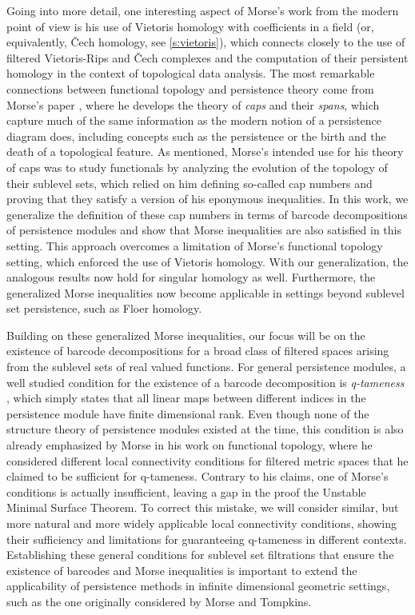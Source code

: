 Going into more detail, one interesting aspect of Morse's work from the modern point of view is his use of Vietoris homology with coefficients in a field (or, equivalently, \v{C}ech homology, see \cref{s:vietoris}), which connects closely to the use of filtered Vietoris-Rips and \v{C}ech complexes and the computation of their persistent homology in the context of topological data analysis.
The most remarkable connections between functional topology and persistence theory come from Morse's paper \cite{Morse.1940}, where he develops the theory of \emph{caps} and their \emph{spans}, which capture much of the same information as the modern notion of a persistence diagram does, including concepts such as the persistence or the birth and the death of a topological feature.
As mentioned, Morse's intended use for his theory of caps was to study functionals by analyzing the evolution of the topology of their sublevel sets, which relied on him defining so-called cap numbers and proving that they satisfy a version of his eponymous inequalities.
In this work, we generalize the definition of these cap numbers in terms of barcode decompositions of persistence modules and show that Morse inequalities are also satisfied in this setting.
This approach overcomes a limitation of Morse's functional topology setting, which enforced the use of Vietoris homology.
With our generalization, the analogous results now hold for singular homology as well.
Furthermore, the generalized Morse inequalities now become applicable in settings beyond sublevel set persistence, such as Floer homology.

Building on these generalized Morse inequalities, our focus will be on the existence of barcode decompositions for a broad class of filtered spaces arising from the sublevel sets of real valued functions.  
For general persistence modules, a well studied condition for the existence of a barcode decomposition is \emph{q-tameness} \cite{Chazal.2016a,Chazal.2016b}, which simply states that all linear maps between different indices in the persistence module have finite dimensional rank.
Even though none of the structure theory of persistence modules existed at the time, this condition is also already emphasized by Morse in his work on functional topology, where he considered different local connectivity conditions for filtered metric spaces that he claimed to be sufficient for q-tameness.
Contrary to his claims, one of Morse's conditions is actually insufficient, leaving a gap in the proof the Unstable Minimal Surface Theorem.
To correct this mistake, we will consider similar, but more natural and more widely applicable local connectivity conditions,
showing their sufficiency and limitations for guaranteeing q-tameness in different contexts.
Establishing these general conditions for sublevel set filtrations that ensure the existence of barcodes and Morse inequalities is important to extend the applicability of persistence methods in infinite dimensional geometric settings, such as the one originally considered by Morse and Tompkins.

